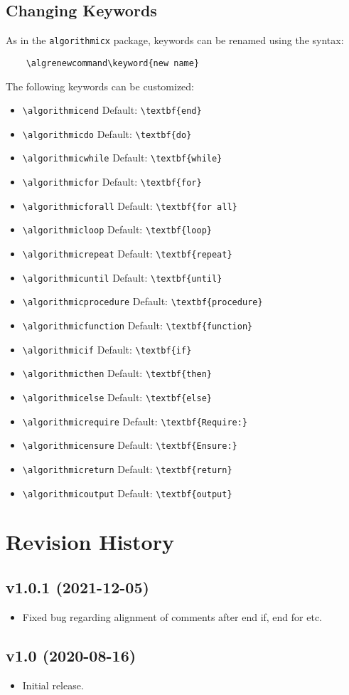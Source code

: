 \documentclass[11pt,a4paper,USenglish]{article}
\begin{document}
\subsection{Changing Keywords}
As in the \texttt{algorithmicx} package, keywords can be renamed using the syntax:
\begin{verbatim}
	\algrenewcommand\keyword{new name}
\end{verbatim}
The following keywords can be customized:
\begin{itemize}
	\item \verb|\algorithmicend|
	\hfill Default: \verb|\textbf{end}|
	\item \verb|\algorithmicdo|
	\hfill Default: \verb|\textbf{do}|
	\item \verb|\algorithmicwhile|
	\hfill Default: \verb|\textbf{while}|
	\item \verb|\algorithmicfor|
	\hfill Default: \verb|\textbf{for}|
	\item \verb|\algorithmicforall|
	\hfill Default: \verb|\textbf{for all}|
	\item \verb|\algorithmicloop|
	\hfill Default: \verb|\textbf{loop}|
	\item \verb|\algorithmicrepeat|
	\hfill Default: \verb|\textbf{repeat}|
	\item \verb|\algorithmicuntil|
	\hfill Default: \verb|\textbf{until}|
	\item \verb|\algorithmicprocedure|
	\hfill Default: \verb|\textbf{procedure}|
	\item \verb|\algorithmicfunction|
	\hfill Default: \verb|\textbf{function}|
	\item \verb|\algorithmicif|
	\hfill Default: \verb|\textbf{if}|
	\item \verb|\algorithmicthen|
	\hfill Default: \verb|\textbf{then}|
	\item \verb|\algorithmicelse|
	\hfill Default: \verb|\textbf{else}|
	\item \verb|\algorithmicrequire|
	\hfill Default: \verb|\textbf{Require:}|
	\item \verb|\algorithmicensure|
	\hfill Default: \verb|\textbf{Ensure:}|
	\item \verb|\algorithmicreturn|
	\hfill Default: \verb|\textbf{return}|
	\item \verb|\algorithmicoutput|
	\hfill Default: \verb|\textbf{output}|
\end{itemize}

\section{Revision History}

\subsection*{v1.0.1 (2021-12-05)}
\begin{itemize}
	\item Fixed bug regarding alignment of comments after end if, end for etc.
\end{itemize}

\subsection*{v1.0 (2020-08-16)}
\begin{itemize}
	\item Initial release.
\end{itemize}
\end{document}
